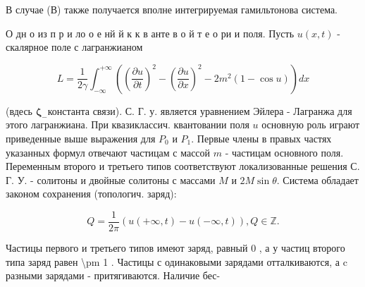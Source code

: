 \documentclass[10pt]{article}
\begin{document}
В случае (В) также получается вполне интегрируемая гамильтонова система.



О дн о из п р и ло о е нй й к к в анте в о й т е о ри и поля. Пусть $u(x, t)$ - скалярное поле с лагранжианом



\[

L=\frac{1}{2 \gamma} \int_{-\infty}^{+\infty}\left(\left(\frac{\partial u}{\partial t}\right)^{2}-\left(\frac{\partial u}{\partial x}\right)^{2}-2 m^{2}(1-\cos u)\right) d x

\]



(вдесь $\boldsymbol{\zeta}_{-}$константа связи). С. Г. у. является уравнением Эйлера - Лагранжа для этого лагранжиана. При квазиклассич. квантовании поля $u$ основную роль играют приведенные выше выражения для $P_{0}$ и $P_{1}$. Первые члены в правых частях указанных формул отвечают частицам с массой $m$ - частицам основного поля. Переменным второго и третьего типов соответствуют локализованные решения С. Г. У. - солитоны и двойные солитоны с массами $M$ и $2 M \sin \theta$. Система обладает законом сохранения (топологич. заряд):



\[

Q=\frac{1}{2 \pi}(u(+\infty, t)-u(-\infty, t)), Q \in \mathbb{Z} .

\]



Частицы первого и третьего типов имеют заряд, равный 0 , а у частиц второго типа заряд равен \textbackslash pm 1 . Частицы с одинаковыми зарядами отталкиваются, а c разными зарядами - притягиваются. Наличие бес-
\end{document}
